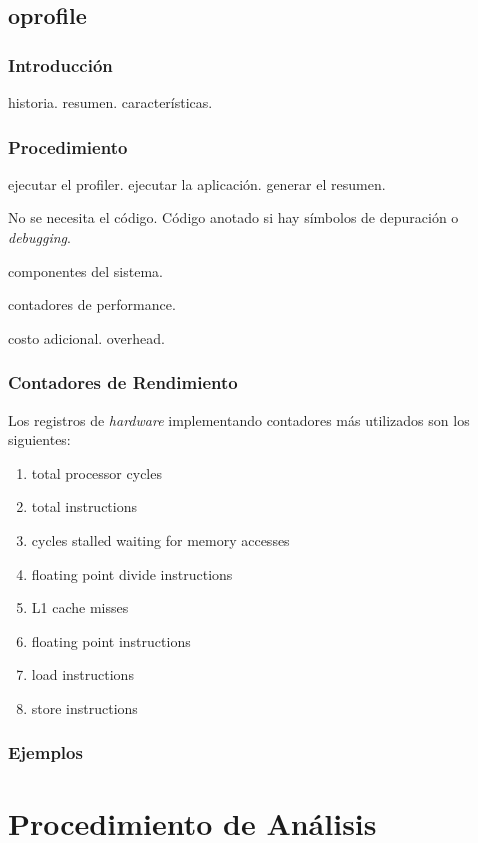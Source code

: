 \documentclass[a4paper]{report}
\begin{document}
\section{oprofile}

\subsection{Introducci\'on}

historia. resumen. caracter\'isticas. 

\subsection{Procedimiento}

ejecutar el profiler. ejecutar la aplicaci\'on. generar el resumen.

No se necesita el c\'odigo. C\'odigo anotado si hay s\'imbolos de depuraci\'on o
{\it debugging}.

componentes del sistema.

contadores de performance.

costo adicional. overhead.

\subsection{Contadores de Rendimiento}

Los registros de {\it hardware} implementando contadores m\'as utilizados son los
siguientes:

\begin{enumerate}
\item total processor cycles
\item total instructions
\item cycles stalled waiting for memory accesses
\item floating point divide instructions
\item L1 cache misses
\item floating point instructions
\item load instructions
\item store instructions
\end{enumerate}

\subsection{Ejemplos}

\chapter{Procedimiento de An\'alisis}
\end{document}
